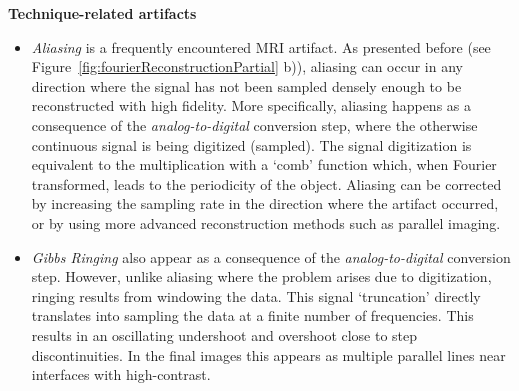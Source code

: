 \textbf{Technique-related artifacts}
    \begin{itemize}
        \item \textit{Aliasing} is a frequently encountered MRI artifact. 
        As presented before (see Figure~\ref{fig:fourierReconstructionPartial} b)), aliasing can occur in any direction where the signal has not been sampled densely enough to be reconstructed with high fidelity.
        More specifically, aliasing happens as a consequence of the \textit{analog-to-digital} conversion step, where the otherwise continuous signal is being digitized (sampled).
        The signal digitization is equivalent to the multiplication with a `comb' function which, when Fourier transformed, leads to the periodicity of the object.
        Aliasing can be corrected by increasing the sampling rate in the direction where the artifact occurred, or by using more advanced reconstruction methods such as parallel imaging.
        
        \item \textit{Gibbs Ringing} also appear as a consequence of the \textit{analog-to-digital} conversion step.
        However, unlike aliasing where the problem arises due to digitization, ringing results from windowing the data.
        This signal `truncation' directly translates into sampling the data at a finite number of frequencies.
        This results in an oscillating undershoot and overshoot close to step discontinuities.
        In the final images this appears as multiple parallel lines near interfaces with high-contrast.
        
    \end{itemize}

\hfill

